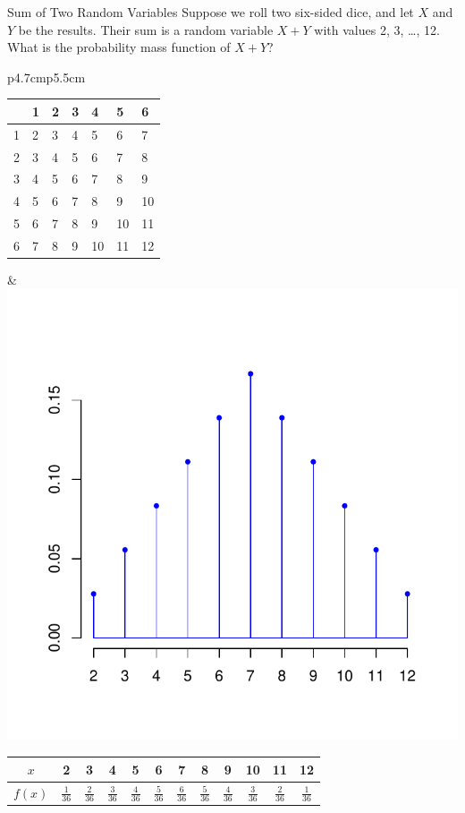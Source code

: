 \documentclass[xcolor=table]{beamer}
\begin{document}
\begin{frame}{Sum of Two Random Variables}
Suppose we roll two six-sided dice, and let $X$ and $Y$ be the results. Their sum is a random variable $X+Y$ with values 2, 3, \dots, 12. What is the probability mass function of $X+Y$?

\pause\vspace{-.5cm}\begin{center}
\begin{tabular}{p{4.7cm}p{5.5cm}}
\vspace{0cm}
\begin{tabular}{l||p{.3cm}|p{.3cm}|p{.3cm}|p{.3cm}|p{.3cm}|p{.3cm}|}
& 1 & 2 & 3 & 4 & 5 & 6 \\ \hline \hline
1& 2 & 3 & 4 & 5 & 6 & 7 \\ \hline
2& 3 & 4 & 5 & 6 & 7 &  8  \\ \hline
3& 4 & 5 & 6 & 7 &  8 & 9 \\ \hline
4& 5 & 6 & 7 &  8 & 9 & 10\\ \hline
5& 6 & 7 &  8 & 9 &10 & 11\\ \hline
6& 7 &  8 & 9 & 10 & 11 & 12\\ \hline
\end{tabular}
&
\vspace{-1.5cm}
\includegraphics[scale=.5]{ch3_pmf2.pdf}
\end{tabular}

\vspace{-.5cm}
\renewcommand{\arraystretch}{1.5}
\begin{tabular}{c||c|c|c|c|c|c|c|c|c|c|c|}
$x$ & 2 & 3 & 4 & 5 & 6 & 7 & 8 & 9 & 10 & 11 & 12 \\ \hline
$f(x)$ & $\frac1{36}$ & $\frac2{36}$ & $\frac3{36}$ & $\frac4{36}$ & $\frac5{36}$ & $\frac6{36}$ & $\frac5{36}$ & $\frac4{36}$ & $\frac3{36}$ & $\frac2{36}$ & $\frac1{36}$
\end{tabular}
\end{center}
\end{frame}
\end{document}
